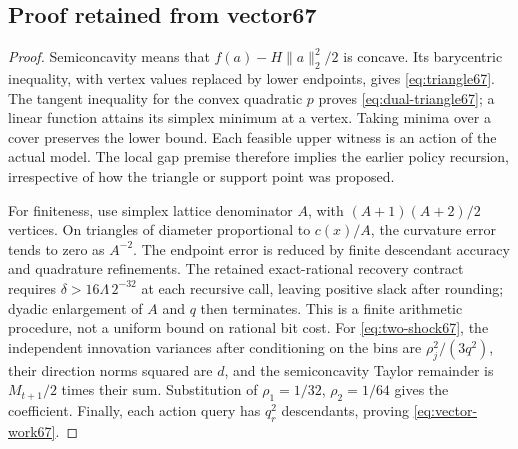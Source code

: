 \subsection{Proof retained from vector67}\label{supp:relocated69-4}
\begin{proof}
Semiconcavity means that $f(a)-H\|a\|_2^2/2$ is concave. Its barycentric inequality, with vertex values replaced by lower endpoints, gives \eqref{eq:triangle67}. The tangent inequality for the convex quadratic $p$ proves \eqref{eq:dual-triangle67}; a linear function attains its simplex minimum at a vertex. Taking minima over a cover preserves the lower bound. Each feasible upper witness is an action of the actual model. The local gap premise therefore implies the earlier policy recursion, irrespective of how the triangle or support point was proposed.

For finiteness, use simplex lattice denominator $A$, with $(A+1)(A+2)/2$ vertices. On triangles of diameter proportional to $c(x)/A$, the curvature error tends to zero as $A^{-2}$. The endpoint error is reduced by finite descendant accuracy and quadrature refinements. The retained exact-rational recovery contract requires $\delta>16\Lambda\,2^{-32}$ at each recursive call, leaving positive slack after rounding; dyadic enlargement of $A$ and $q$ then terminates. This is a finite arithmetic procedure, not a uniform bound on rational bit cost. For \eqref{eq:two-shock67}, the independent innovation variances after conditioning on the bins are $\rho_j^2/(3q^2)$, their direction norms squared are $d$, and the semiconcavity Taylor remainder is $M_{t+1}/2$ times their sum. Substitution of $\rho_1=1/32$, $\rho_2=1/64$ gives the coefficient. Finally, each action query has $q_r^2$ descendants, proving \eqref{eq:vector-work67}.
\end{proof}
